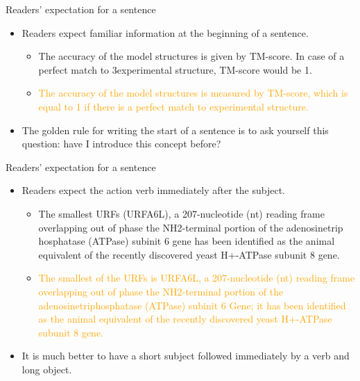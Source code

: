 \documentclass[
 size=14pt,
 paper=smartboard,  %
 mode=present, 		%
 display=slides, 	%
 style=tuliplab,  	%
 pauseslide,
 fleqn,leqno]{powerdot}{}
\begin{document}

\begin{slide}[toc=,bm=]{Readers' expectation for a sentence}
	\begin{itemize}
		\item Readers expect familiar information at the beginning of a sentence.
			\begin{itemize}
				\item \textcolor{mygreen!50}{The accuracy of the model structures is given by TM-score. In case of a perfect match to 3experimental structure, TM-score would be 1.}
				\item \textcolor{orange}{The accuracy of the model structures is measured by TM-score, which is equal to 1 if there is a perfect match to experimental structure.}
			\end{itemize}
		\item The golden rule for writing the start of a sentence is to ask yourself this question: have I introduce this concept before?	
	\end{itemize}
\end{slide}



\begin{slide}[toc=,bm=]{Readers' expectation for a sentence}
	\begin{itemize}
		\item Readers expect the action verb immediately after the subject.
			\begin{itemize}
				\item \textcolor{mygreen!50}{The smallest URFs (URFA6L), a 207-nucleotide (nt) reading frame overlapping out of phase the NH2-terminal portion of the adenosinetrip hosphatase (ATPase) subinit 6 gene has been identified as the animal equivalent of the recently discovered yeast H+-ATPase subunit 8 gene.}
				\item \textcolor{orange}{The smallest of the URFs is URFA6L, a 207-nucleotide (nt) reading frame overlapping out of phase the NH2-terminal portion of the adenosinetriphosphatase (ATPase) subinit 6 Gene; it has been identified as the animal equivalent of the recently discovered yeast H+-ATPase subunit 8 gene.}
			\end{itemize}
		\item It is much better to have a short subject followed immediately by a verb and long object.	
	\end{itemize}
\end{slide}
\end{document}

